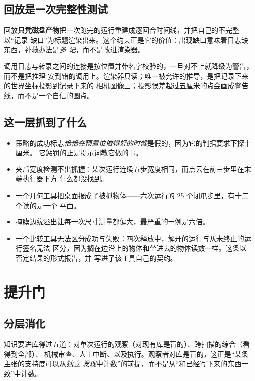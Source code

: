 \documentclass[11pt,a4paper,UTF8,fontset=macnew]{ctexrep}
\begin{document}
\section{回放是一次完整性测试}

回放\textbf{只凭磁盘产物}把一次跑完的运行重建成逐回合时间线，并把自己的不完整以“记录
缺口”为标题渲染出来。这个约束正是它的价值：出现缺口意味着日志缺东西，补救办法是\emph{多
记}，而不是改进渲染器。

调用日志与转录之间的连接是按位置并带名字校验的，一旦对不上就降级为警告，而不是把推理
安到错的调用上。渲染器只读；唯一被允许的推导，是把记录下来的世界坐标投影到记录下来的
相机图像上；投影误差超过五厘米的点会画成警告线，而不是一个自信的圆点。

\section{这一层抓到了什么}

\begin{itemize}
\item 策略的成功标志\emph{恰恰在预置位做得好的时候}是假的，因为它的判据要求下探十厘米。
      它惩罚的正是提示词教它做的事。
\item 夹爪宽度检测不出抓握：某次运行连续五步宽度相同，而点云在前三步里在末端执行器下方
      什么都没找到。
\item 一个几何工具把桌面报成了被抓物体——六次运行的 25 个闭爪步里，有十二个读的是一个
      平面。
\item 掩膜边缘溢出让每一次尺寸测量都偏大，最严重的一例是六倍。
\item 一个比较工具无法区分成功与失败：四次释放中，解开的运行与从未终止的运行签名无法
      区分，因为搁在边沿上的物体和坐进去的物体读数一样。这条以否定结果的形式报告，并
      写进了该工具自己的契约。
\end{itemize}

\chapter{提升门}

\section{分层消化}

知识要进库得过五道：对单次运行的观察（对现有库是盲的）、跨扫描的综合（看得到全部）、
机械审查、人工中断、以及执行。观察者对库是盲的，这正是“某条主张的支持度可以从\emph{独立
发现}中计数”的前提，而不是从“和已经写下来的东西一致”中计数。
\end{document}
